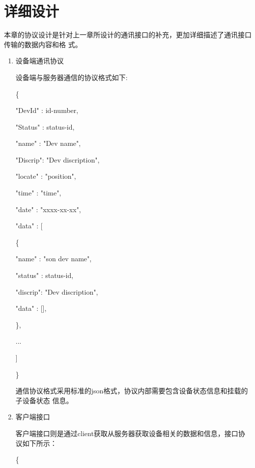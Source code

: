 \documentclass[a4paper,12pt]{report}
\begin{document}
\chapter{详细设计}
\begin{spacing}{1.5}       

本章的协议设计是针对上一章所设计的通讯接口的补充，更加详细描述了通讯接口传输的数据内容和格
式。
\begin{enumerate}[(1)]
    \itemsep=3pt
    \parskip=0pt
    \setlength{\itemindent}{2em}
    \item 设备端通讯协议
       
        设备端与服务器通信的协议格式如下:
        \begin{tcolorbox}[notitle,boxrule=0pt,colback=gray!20,colframe=blue!20]
            \{

                "DevId"  : id-number,

                "Status" : status-id,

                "name"   : "Dev name",

                "Discrip": "Dev discription",

                "locate" : "position",
                
                "time"   : "time",

                "date"   : "xxxx-xx-xx",

                "data"   : [

                    \quad\{

                        \quad\quad"name"   : "son dev name",

                        \quad\quad"status" : status-id,

                        \quad\quad"discrip": "Dev discription",

                        \quad\quad"data"   : [],

                    \quad\},

                    \quad...
                    
                ]

            \}
        \end{tcolorbox}
        通信协议格式采用标准的json格式，协议内部需要包含设备状态信息和挂载的子设备状态
        信息。
        
    \item 客户端接口

        客户端接口则是通过client获取从服务器获取设备相关的数据和信息，接口协议如下所示：
        \begin{tcolorbox}[notitle,boxrule=0pt,colback=gray!20,colframe=blue!20]
            \{


\end{tcolorbox}
\end{enumerate}
\end{spacing}
\end{document}
